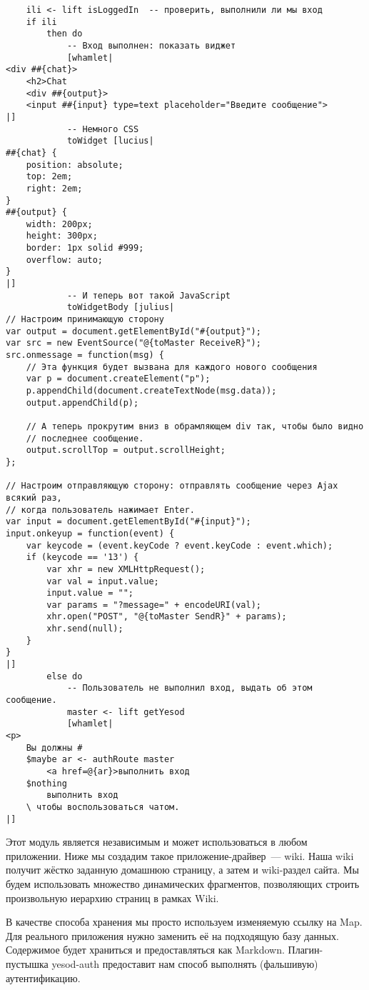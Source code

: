 \begin{lstlisting}
    ili <- lift isLoggedIn  -- проверить, выполнили ли мы вход
    if ili
        then do
            -- Вход выполнен: показать виджет
            [whamlet|
<div ##{chat}>
    <h2>Chat
    <div ##{output}>
    <input ##{input} type=text placeholder="Введите сообщение">
|]
            -- Немного CSS
            toWidget [lucius|
##{chat} {
    position: absolute;
    top: 2em;
    right: 2em;
}
##{output} {
    width: 200px;
    height: 300px;
    border: 1px solid #999;
    overflow: auto;
}
|]
            -- И теперь вот такой JavaScript
            toWidgetBody [julius|
// Настроим принимающую сторону
var output = document.getElementById("#{output}");
var src = new EventSource("@{toMaster ReceiveR}");
src.onmessage = function(msg) {
    // Эта функция будет вызвана для каждого нового сообщения
    var p = document.createElement("p");
    p.appendChild(document.createTextNode(msg.data));
    output.appendChild(p);

    // А теперь прокрутим вниз в обрамляющем div так, чтобы было видно
    // последнее сообщение.
    output.scrollTop = output.scrollHeight;
};

// Настроим отправляющую сторону: отправлять сообщение через Ajax всякий раз,
// когда пользователь нажимает Enter.
var input = document.getElementById("#{input}");
input.onkeyup = function(event) {
    var keycode = (event.keyCode ? event.keyCode : event.which);
    if (keycode == '13') {
        var xhr = new XMLHttpRequest();
        var val = input.value;
        input.value = "";
        var params = "?message=" + encodeURI(val);
        xhr.open("POST", "@{toMaster SendR}" + params);
        xhr.send(null);
    }
}
|]
        else do
            -- Пользователь не выполнил вход, выдать об этом сообщение.
            master <- lift getYesod
            [whamlet|
<p>
    Вы должны #
    $maybe ar <- authRoute master
        <a href=@{ar}>выполнить вход
    $nothing
        выполнить вход
    \ чтобы воспользоваться чатом.
|]
\end{lstlisting}

Этот модуль является независимым и может использоваться в любом приложении. Ниже мы создадим такое приложение-драйвер~--- wiki. Наша wiki получит жёстко заданную домашнюю страницу, а затем и wiki-раздел сайта. Мы будем использовать множество динамических фрагментов, позволяющих строить произвольную иерархию страниц в рамках Wiki.

В качестве способа хранения мы просто используем изменяемую ссылку на Map. Для реального приложения нужно заменить её на подходящую базу данных. Содержимое будет храниться и предоставляться как Markdown. Плагин-пустышка yesod-auth предоставит нам способ выполнять (фальшивую) аутентификацию.

